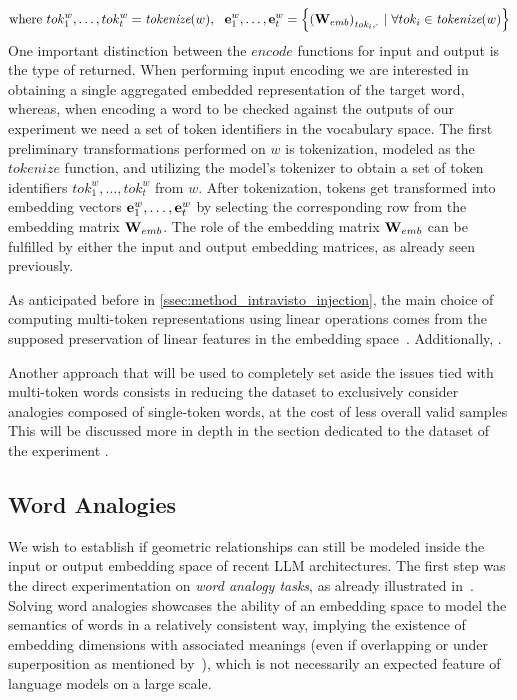 \vspace{0.25em}
\begin{equation*}
    \text{where}\  tok_1^w,\ldots,tok_t^w = \textit{tokenize}(w)
    ,\ \ \bm{\mathbf{e}}_1^w, \ldots, \bm{\mathbf{e}}_{t}^w = \Bigl\{ {{(\bm{\mathbf{W}}_{emb})}_{\textit{tok}_{i},\cdot}} \ |\ \forall tok_i \in \textit{tokenize}(w) \Bigr\}
\end{equation*}
One important distinction between the $\textit{encode}$ functions for input and output is the type of  returned.
When performing input encoding we are interested in obtaining a single aggregated embedded representation of the target word, whereas, when encoding a word to be checked against the outputs of our experiment we need a set of token identifiers in the vocabulary space.
The first preliminary transformations performed on $w$ is tokenization, modeled as the $\textit{tokenize}$ function, and utilizing the model's tokenizer to obtain a set of token identifiers $tok_1^w,\ldots,tok_t^w$ from $w$.
After tokenization, tokens get transformed into embedding vectors $\bm{\mathbf{e}}_1^w, \ldots, \bm{\mathbf{e}}_{t}^w$ by selecting the corresponding row from the embedding matrix $\bm{\mathbf{W}}_{emb}$.
The role of the embedding matrix $\bm{\mathbf{W}}_{emb}$ can be fulfilled by either the input and output embedding matrices, as already seen previously.

As anticipated before in \cref{ssec:method_intravisto_injection}, the main choice of computing multi-token representations using linear operations comes from the supposed preservation of linear features in the embedding space~\cite{mikolov2013,park2023}.
Additionally, .

Another approach that will be used to completely set aside the issues tied with multi-token words consists in reducing the dataset to exclusively consider analogies composed of single-token words, at the cost of less overall valid samples
This will be discussed more in depth in the section dedicated to the dataset of the experiment .

\subsection{Word Analogies}\label{ssec:method_embeddings_analogies}

We wish to establish if geometric relationships can still be modeled inside the input or output embedding space of recent LLM architectures.
The first step  was the direct experimentation on \emph{word analogy tasks}, as already illustrated in~\citet{mikolov2013}.
Solving word analogies showcases the ability of an embedding space to model the semantics of words in a relatively consistent way, implying the existence of embedding dimensions with associated meanings (even if overlapping or under superposition as mentioned by~\citet{elhage2022,henighan2023}), which is not necessarily an expected feature of language models on a large scale.

